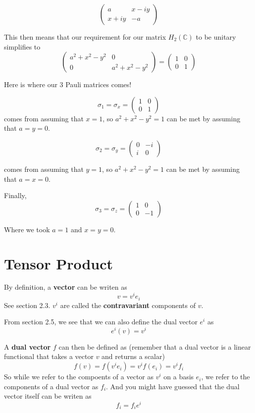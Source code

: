 $$
\begin{pmatrix}
a      & x - iy \\
x + iy & -a
\end{pmatrix}
$$

This then means that our requirement for our matrix $H_2 (\mathbb{C})$ to be unitary simplifies to
$$
\begin{pmatrix}
a^2 + x^2 - y^2 & 0                \\
0               & a^2 + x^2 - y^2
\end{pmatrix}
=
\begin{pmatrix}
1 & 0 \\
0 & 1
\end{pmatrix}
$$

Here is where our 3 Pauli matrices comes!

$$
\sigma_1 = \sigma_x =  
\begin{pmatrix}
1 & 0 \\
0 & 1
\end{pmatrix}
$$
comes from assuming that $x=1$, so $a^2 + x^2 - y^2 = 1$ can be met by assuming that $a = y = 0$.

$$
\sigma_2 = \sigma_y =  
\begin{pmatrix}
0 & -i \\
i & 0
\end{pmatrix}
$$

comes from assuming that $y=1$, so $a^2 + x^2 - y^2 = 1$ can be met by assuming that $a = x = 0$.

Finally,
$$
\sigma_3 = \sigma_z =  
\begin{pmatrix}
1 & 0 \\
0 & -1
\end{pmatrix}
$$

Where we took $a=1$ and $x = y = 0$.




\section{Tensor Product}


By definition, a \textbf{vector} can be writen as
$$
v = v^i e_i
$$
See section 2.3.
$v^i$ are called the \textbf{contravariant} components of $v$.

From section 2.5, we see that we can also define the dual vector $e^i$ as
$$
e^i(v) = v^i
$$

A \textbf{dual vector} $f$ can then be defined as (remember that a dual vector is a linear functional
that takes a vector $v$ and returns a scalar)
$$
f(v)
= f(v^i e_i)
= v^i f(e_i)
= v^i f_i
$$
So while we refer to the compoents of a vector as $v^i$ on a basis $e_i$,
we refer to the components of a dual vector as $f_i$.
And you might have guessed that the dual vector itself can be writen as
$$
f_i = f_i e^i
$$

